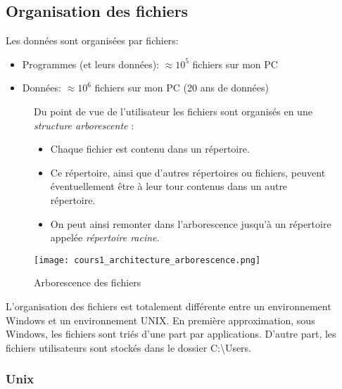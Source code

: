 \subsection{Organisation des fichiers}


Les données sont organisées par fichiers:
  \begin{itemize}
  \item Programmes (et leurs données): $\approx 10^{5}$ fichiers sur mon PC
  \item Données: $\approx 10^{6}$ fichiers sur mon PC (20 ans de données)
  \end{itemize}
  
\begin{figure}[!htb]
\begin{minipage}{0.5\textwidth}
Du point de vue de l'utilisateur les fichiers sont organisés en une \emph{structure arborescente} :
\begin{itemize}
	\item Chaque fichier est contenu dans un répertoire. 
	\item Ce répertoire, ainsi que d'autres répertoires ou fichiers, peuvent éventuellement être à leur tour contenus dans un autre répertoire.
	\item On peut ainsi remonter dans l'arborescence jusqu'à un répertoire appelée \emph{répertoire racine}.
\end{itemize}

\end{minipage}
\begin{minipage}{0.5\textwidth}
\begin{center}
\texttt{[image: cours1\_architecture\_arborescence.png]}\\
\caption{Arborescence des fichiers \label{arbo}}
\end{center}
\end{minipage}
\end{figure}


\begin{remarque}
L'organisation des fichiers est totalement différente entre un environnement Windows et un environnement UNIX. 
En première approximation, sous Windows, les fichiers sont triés d'une part par applications. D'autre part, les fichiers utilisateurs sont stockés dans le dossier C:\textbackslash Users.
\end{remarque}



\subsubsection{Unix}

